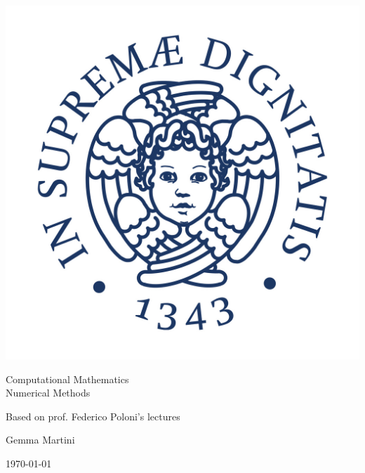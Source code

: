 \documentclass[computationalMathematics.tex]{subfiles}
\begin{document}
\begin{titlepage}
    \begin{center}
    \vspace{3cm}
    
    \Large
    
    \vspace{2cm}
    
    \includegraphics[scale=0.3]{pics/Cherubino.jpg}
    
    \vspace{2.5cm}
    
    {\Huge \sc Computational Mathematics\\ Numerical Methods}
    
    \vspace{2cm}
    Based on prof. Federico Poloni's lectures
    
    \vspace{2cm}
    Gemma Martini
    \vfill
    
    \today
    
    \end{center}
\end{titlepage}


\shipout\null%
\end{document}
